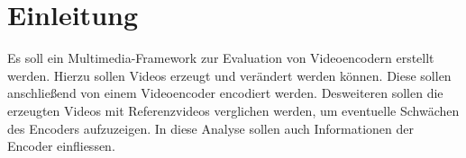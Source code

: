 ﻿\section{Einleitung}

Es soll ein Multimedia-Framework zur Evaluation von Videoencodern erstellt werden. Hierzu sollen Videos erzeugt und verändert werden können. Diese sollen anschließend von einem Videoencoder encodiert werden. Desweiteren sollen die erzeugten Videos mit Referenzvideos verglichen werden, um eventuelle Schwächen des Encoders aufzuzeigen. In diese Analyse sollen auch Informationen der Encoder einfliessen.
